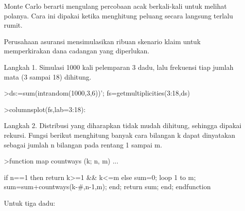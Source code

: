 \documentclass[a4paper,10pt]{article}
\begin{document}
\begin{eulernotebook}
\begin{eulercomment}
\begin{eulercomment}
\begin{eulercomment}
\begin{eulercomment}
\begin{eulercomment}
\begin{eulercomment}
\begin{eulercomment}
\begin{eulercomment}
\begin{eulercomment}
\begin{eulercomment}
\begin{eulercomment}
\begin{eulercomment}
\begin{eulercomment}
\begin{eulercomment}
\begin{eulercomment}
\begin{eulercomment}
\begin{eulercomment}
\begin{eulercomment}
\begin{eulercomment}
\begin{eulercomment}
\begin{eulercomment}
\end{eulercomment}
\begin{eulercomment}
Monte Carlo berarti mengulang percobaan acak berkali-kali untuk melihat polanya. Cara ini
dipakai ketika menghitung peluang secara langsung terlalu rumit.

\end{eulercomment}
\begin{eulercomment}
Perusahaan asuransi mensimulasikan ribuan skenario klaim untuk memperkirakan dana cadangan
yang diperlukan.

\end{eulercomment}
\begin{eulercomment}
Langkah 1. Simulasi 1000 kali pelemparan 3 dadu, lalu frekuensi tiap jumlah mata (3 sampai
18) dihitung.
\end{eulercomment}
\begin{eulerprompt}
>ds:=sum(intrandom(1000,3,6))';  fs=getmultiplicities(3:18,ds)
\end{eulerprompt}
\begin{euleroutput}
  [4,  19,  27,  41,  72,  100,  118,  118,  138,  108,  77,  75,  57,
  32,  12,  2]
\end{euleroutput}
\begin{eulerprompt}
>columnsplot(fs,lab=3:18):
\end{eulerprompt}
\begin{eulercomment}
Langkah 2. Distribusi yang diharapkan tidak mudah dihitung, sehingga dipakai rekursi.
Fungsi berikut menghitung banyak cara bilangan k dapat dinyatakan sebagai jumlah n bilangan
pada rentang 1 sampai m.
\end{eulercomment}
\begin{eulerprompt}
>function map countways (k; n, m) ...
\end{eulerprompt}
\begin{eulerudf}
    if n==1 then return k>=1 && k<=m
    else
      sum=0;
      loop 1 to m; sum=sum+countways(k-#,n-1,m); end;
      return sum;
    end;
  endfunction
\end{eulerudf}
\begin{eulercomment}
Untuk tiga dadu:
\end{eulercomment}

\end{eulercomment}
\end{eulercomment}
\end{eulercomment}
\end{eulercomment}
\end{eulercomment}
\end{eulercomment}
\end{eulercomment}
\end{eulercomment}
\end{eulercomment}
\end{eulercomment}
\end{eulercomment}
\end{eulercomment}
\end{eulercomment}
\end{eulercomment}
\end{eulercomment}
\end{eulercomment}
\end{eulercomment}
\end{eulercomment}
\end{eulercomment}
\end{eulercomment}
\end{eulernotebook}
\end{document}
